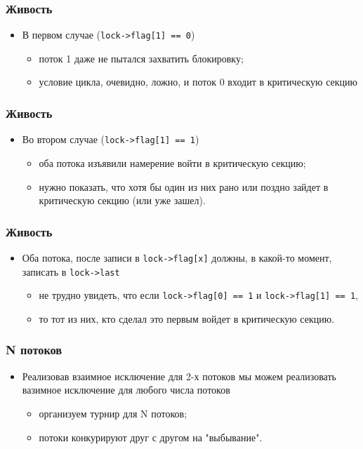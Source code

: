 \begin{frame}
\frametitle{Живость}
\begin{itemize}
    \item<1->В первом случае (\lstinline|lock->flag[1] == 0|)
    \begin{itemize}
        \item<2->поток 1 даже не пытался захватить блокировку;
        \item<3->условие цикла, очевидно, ложно, и поток 0 входит в
             критическую секцию
    \end{itemize}
\end{itemize}
\end{frame}

\begin{frame}
\frametitle{Живость}
\begin{itemize}
    \item<1->Во втором случае (\lstinline|lock->flag[1] == 1|)
    \begin{itemize}
        \item<2->оба потока изъявили намерение войти в критическую секцию;
        \item<3->нужно показать, что хотя бы один из них рано или поздно
             зайдет в критическую секцию (или уже зашел).
    \end{itemize}
\end{itemize}
\end{frame}

\begin{frame}
\frametitle{Живость}
\begin{itemize}
    \item<1->Оба потока, после записи в \lstinline|lock->flag[x]| должны, в
         какой-то момент, записать в \lstinline|lock->last|
    \begin{itemize}
        \item<2->не трудно увидеть, что если \lstinline|lock->flag[0] == 1| и
             \lstinline|lock->flag[1] == 1|,
        \item<2->то тот из них, кто сделал это первым войдет в критическую
             секцию.
    \end{itemize}
\end{itemize}
\end{frame}


\begin{frame}
\frametitle{N потоков}
\begin{itemize}
    \item<1->Реализовав взаимное исключение для 2-х потоков мы можем
         реализовать вазимное исключение для любого числа потоков
    \begin{itemize}
        \item<2->организуем турнир для N потоков;
        \item<3->потоки конкурируют друг с другом на "выбывание".
    \end{itemize}
\end{itemize}
\end{frame}

